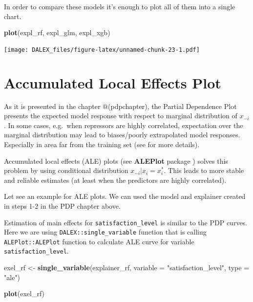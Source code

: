 \documentclass[]{book}
\newenvironment{Shaded}{\begin{snugshade}}{\end{snugshade}}
\newcommand{\KeywordTok}[1]{\textcolor[rgb]{0.13,0.29,0.53}{\textbf{#1}}}
\newcommand{\DataTypeTok}[1]{\textcolor[rgb]{0.13,0.29,0.53}{#1}}
\newcommand{\StringTok}[1]{\textcolor[rgb]{0.31,0.60,0.02}{#1}}
\newcommand{\NormalTok}[1]{#1}
\theoremstyle{definition}
\theoremstyle{definition}
\theoremstyle{definition}
\theoremstyle{remark}
\begin{document}
In order to compare these models it's enough to plot all of them into a
single chart.

\begin{Shaded}
\begin{Highlighting}[]
\KeywordTok{plot}\NormalTok{(expl_rf, expl_glm, expl_xgb)}
\end{Highlighting}
\end{Shaded}

\texttt{[image: DALEX\_files/figure-latex/unnamed-chunk-23-1.pdf]}

\section{Accumulated Local Effects
Plot}\label{accumulated-local-effects-plot}

As it is presented in the chapter @(pdpchapter), the Partial Dependence
Plot presents the expected model response with respect to marginal
distribution of \(x_{-i}\). In some cases, e.g.~when repressors are
highly correlated, expectation over the marginal distribution may lead
to biases/poorly extrapolated model responses. Especially in area far
from the training set (see \citep{ALEPlot} for more details).

Accumulated local effects (ALE) plots (see \textbf{ALEPlot} package
\citep{ALEPlot}) solves this problem by using conditional distribution
\(x_{-i}|x_i = x_i^*\). This leads to more stable and reliable estimates
(at least when the predictors are highly correlated).

Let see an example for ALE plots. We can used the model and explainer
created in steps 1-2 in the PDP chapter above.

Estimation of main effects for \texttt{satisfaction\_level} is similar
to the PDP curves. Here we are using \texttt{DALEX::single\_variable}
function that is calling \texttt{ALEPlot::ALEPlot} function to calculate
ALE curve for variable \texttt{satisfaction\_level}.

\begin{Shaded}
\begin{Highlighting}[]
\NormalTok{exel_rf  <-}\StringTok{ }\KeywordTok{single_variable}\NormalTok{(explainer_rf, }\DataTypeTok{variable =} \StringTok{"satisfaction_level"}\NormalTok{, }\DataTypeTok{type =} \StringTok{"ale"}\NormalTok{)}

\KeywordTok{plot}\NormalTok{(exel_rf)}
\end{Highlighting}
\end{Shaded}
\end{document}
